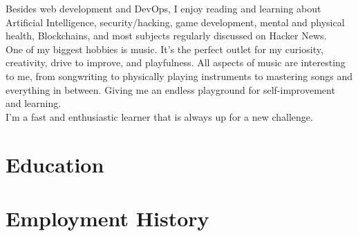 \documentclass[10pt]{article} %
\begin{document}
Besides web development and DevOps, I enjoy reading and learning about Artificial Intelligence, security/hacking, game development, mental and physical health, Blockchains, and most subjects regularly discussed on Hacker News. \\

One of my biggest hobbies is music. It's the perfect outlet for my curiosity, creativity, drive to improve, and playfulness. All aspects of music are interesting to me, from songwriting to physically playing instruments to mastering songs and everything in between. Giving me an endless playground for self-improvement and learning.  \\

I'm a fast and enthusiastic learner that is always up for a new challenge.


\section{Education}





\section{Employment History}
\end{document}
